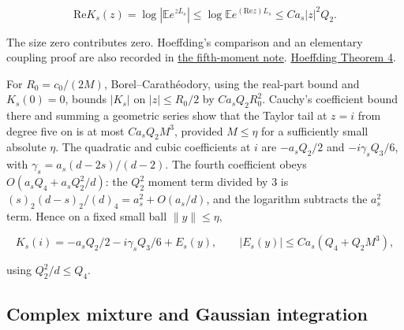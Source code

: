 \begin{equation*}
\mathrm{Re}K_s(z)=\log|\mathbb E e^{zL_s}|
\le \log\mathbb E e^{(\mathrm{Re}z)L_s}
\le C a_s |z|^2Q_2.
\end{equation*}

The size zero contributes zero. Hoeffding's comparison and an elementary coupling proof are also recorded in \href{https://github.com/ProgramComputer/open-math-research/blob/78e9ef2c0c0b7a5daed126efbe12a46d030d8200/topics/balanced-arrays/fifth-thirds/subquadratic-interior-saddle.md}{the fifth-moment note}. \href{https://doi.org/10.1080/01621459.1963.10500830}{Hoeffding Theorem 4}.

For $R_0=c_0/(2M)$, Borel--Carathéodory, using the real-part bound and $K_s(0)=0$, bounds $|K_s|$ on $|z|\le R_0/2$ by $C a_s Q_2R_0^2$. Cauchy's coefficient bound there and summing a geometric series show that the Taylor tail at $z=i$ from degree five on is at most $C a_s Q_2M^3$, provided $M\le\eta$ for a sufficiently small absolute $\eta$. The quadratic and cubic coefficients at $i$ are $-a_sQ_2/2$ and $-i\gamma_s Q_3/6$, with $\gamma_s=a_s(d-2s)/(d-2)$. The fourth coefficient obeys $O(a_sQ_4+a_sQ_2^2/d)$: the $Q_2^2$ moment term divided by 3 is $(s)_2(d-s)_2/(d)_4=a_s^2+O(a_s/d)$, and the logarithm subtracts the $a_s^2$ term. Hence on a fixed small ball $\|y\|\le\eta$,

\begin{equation*}
K_s(i)=-a_sQ_2/2-i\gamma_sQ_3/6+E_s(y),\qquad
|E_s(y)|\le C a_s(Q_4+Q_2M^3),
\end{equation*}

using $Q_2^2/d\le Q_4$.

\subsection{Complex mixture and Gaussian integration}

